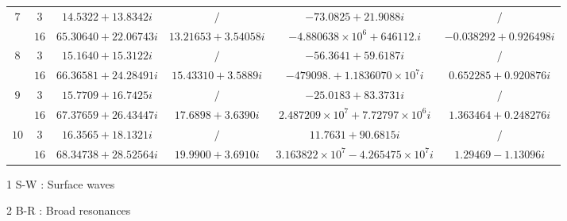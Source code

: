 \documentclass[aps,prd,longbibliography,reprint,twocolumn,amsmath,amssymb,amsfonts,showpacs,footnote,superscriptaddress]{revtex4-1}%
\begin{document}
\begin{table}[htp]
\begin{threeparttable}[htp]
\begin{ruledtabular}
\begin{tabular}{cccccc}
$7$  & $3$  & $14.5322+13.8342 i$  & $/$   & $-73.0825+21.9088 i$ & $/$     \\
     & $16$  & $65.30640+22.06743 i$  & $13.21653+3.54058 i$  & $-4.880638\times 10^6+646112. i$  & $-0.038292+0.926498 i$    \\

$8$  & $3$  & $15.1640+15.3122 i$  & $/$   & $-56.3641+59.6187 i$ & $/$     \\
     & $16$  & $66.36581+24.28491 i$  & $15.43310+3.5889 i$  & $-479098.+1.1836070\times 10^7 i$  & $0.652285+0.920876 i$    \\

$9$  & $3$  & $15.7709+16.7425 i$  & $/$   & $-25.0183+83.3731 i$ & $/$     \\
     & $16$  & $67.37659+26.43447 i$  & $17.6898+3.6390 i$  & $2.487209\times 10^7+7.72797\times 10^6 i$  & $1.363464+0.248276 i$    \\

$10$  & $3$  & $16.3565+18.1321 i$  & $/$   & $11.7631+90.6815 i$ & $/$     \\
     & $16$  & $68.34738+28.52564 i $  & $19.9900+3.6910 i$  & $3.163822\times 10^7-4.265475\times 10^7 i$  & $1.29469-1.13096 i$    \\
\end{tabular}
\end{ruledtabular}
\begin{tablenotes}
     \item[1] S-W : Surface waves
     \item[2] B-R : Broad resonances
   \end{tablenotes}
\end{threeparttable}
\end{table}
\endgroup
\end{document}
